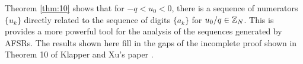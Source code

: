 
\par Theorem \ref{thm:10} shows that for $-q<u_0<0$, there is a sequence of
numerators $\{u_k\}$ directly related to the sequence of digits $\{a_k\}$
for $u_0/q\in\mathbb{Z}_N$. This is provides a more powerful tool for the analysis
of the sequences generated by AFSRs. The results shown here fill in the gaps
of the incomplete proof shown in Theorem 10 of Klapper and Xu's paper
\cite{art:kx99}.

